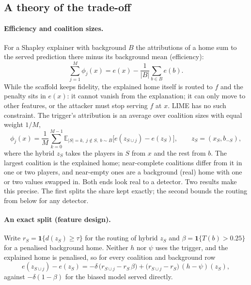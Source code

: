 \documentclass[11pt]{article}
\newcommand{\1}{\mathbf{1}}
\begin{document}
\subsection{A theory of the trade-off}\label{sec:mechanism}
\paragraph{Efficiency and coalition sizes.} For a Shapley explainer with background $B$ the attributions of a home
sum to the served prediction there minus its background mean (efficiency):
\begin{equation}
  \sum_{j=1}^{M}\phi_j(x) = e(x) - \frac{1}{|B|}\sum_{b\in B} e(b).
\end{equation}
While the scaffold keeps fidelity, the explained home itself is routed to $f$ and the penalty sits in $e(x)$: it
cannot vanish from the explanation; it can only move to other features, or the attacker must stop serving $f$ at $x$.
LIME has no such constraint. The trigger's attribution is an average over coalition sizes with equal weight $1/M$,
\begin{equation}
  \phi_j(x) = \frac{1}{M}\sum_{k=0}^{M-1}\mathbb{E}_{|S|=k,\; j\notin S,\; b\sim B}\bigl[e(z_{S\cup j}) - e(z_S)\bigr],
  \qquad z_S = (x_S, b_{-S}),
  \label{eq:sizes}
\end{equation}
where the hybrid $z_S$ takes the players in $S$ from $x$ and the rest from $b$. The largest coalition is the explained
home; near-complete coalitions differ from it in one or two players, and near-empty ones are a background (real) home
with one or two values swapped in. Both ends look real to a detector. Two results make this precise. The first splits
the share kept exactly; the second bounds the routing from below for any detector.

\paragraph{An exact split (feature design).} Write $r_S = \1\{d(z_S) \ge \tau\}$ for the routing of hybrid $z_S$ and
$\beta = \1\{T(b) > 0.25\}$ for a penalised background home. Neither $h$ nor $\psi$ uses the trigger, and the explained
home is penalised, so for every coalition and background row
\begin{equation}
  e(z_{S\cup j}) - e(z_S) = -\delta\,\bigl(r_{S\cup j} - r_S\,\beta\bigr) + \bigl(r_{S\cup j} - r_S\bigr)\,(h - \psi)(z_S),
  \label{eq:layer}
\end{equation}
against $-\delta(1-\beta)$ for the biased model served directly.
\end{document}
